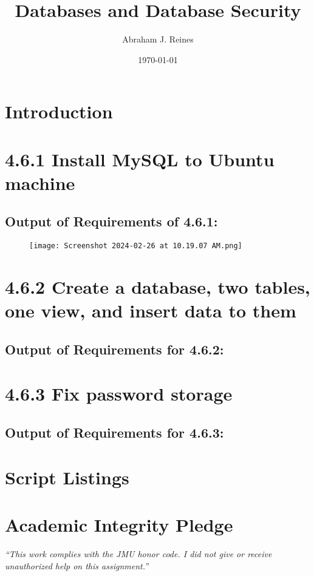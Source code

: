 \documentclass{article}
\title{Databases and Database Security}
\author{Abraham J. Reines}
\date{\today}
\begin{document}
\maketitle

\section*{Introduction}

\section*{4.6.1 Install MySQL to Ubuntu machine}

\subsection*{Output of Requirements of 4.6.1:}
\begin{figure}[H]
    \centering
    \texttt{[image: Screenshot 2024-02-26 at 10.19.07 AM.png]}
    \caption{}
\end{figure}


\section*{4.6.2 Create a database, two tables, one view, and insert data to them}

\subsection*{Output of Requirements for 4.6.2:}



\section*{4.6.3 Fix password storage}

\subsection*{Output of Requirements for 4.6.3:}



\section*{Script Listings}
%


\vfill
  \section*{Academic Integrity Pledge}
    {\color{red}\textit{“This work complies with the JMU honor code. I did not give or receive unauthorized help on this assignment.”}}
\end{document}
